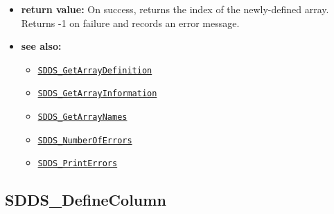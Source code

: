 \documentclass[11pt]{article}
\newcommand{\progref}[1]{\hyperref[SDDS_#1]{\tt SDDS\_#1}}
\begin{document}
\begin{itemize}
\begin{itemize}
\end{itemize}
\item {\bf return value:}\newline
On success, returns the index of the newly-defined array. Returns -1 on failure and records an error message.
\item {\bf see also:}
\begin{itemize}
\item \progref{GetArrayDefinition}
\item \progref{GetArrayInformation}
\item \progref{GetArrayNames}
\item \progref{NumberOfErrors}
\item \progref{PrintErrors}
\end{itemize}
\end{itemize}

\subsection{SDDS\_DefineColumn}
\label{SDDS_DefineColumn}
\end{document}
